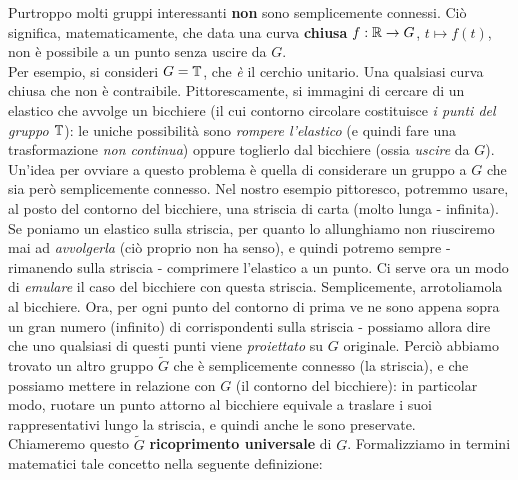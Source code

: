\documentclass[../../FisicaTeorica.tex]{subfiles}
\begin{document}
Purtroppo molti gruppi interessanti \textbf{non} sono semplicemente connessi. Ciò significa, matematicamente, che data una curva \textbf{chiusa} $f: \mathbb{R}\to G$, $t \mapsto f(t)$, non è possibile  a un punto senza uscire da $G$.\\
Per esempio, si consideri $G=\mathbb{T}$, che \textit{è} il cerchio unitario. Una qualsiasi curva chiusa che  non è contraibile. Pittorescamente, si immagini di cercare di  un elastico che avvolge un bicchiere (il cui contorno circolare costituisce \textit{i punti del gruppo $\mathbb{T}$}): le uniche possibilità sono \textit{rompere l'elastico} (e quindi fare una trasformazione \textit{non continua}) oppure toglierlo dal bicchiere (ossia \textit{uscire} da $G$).\\

Un'idea per ovviare a questo problema è quella di considerare un gruppo  a $G$ che sia però semplicemente connesso. Nel nostro esempio pittoresco, potremmo usare, al posto del contorno del bicchiere, una striscia di carta (molto lunga - infinita). Se poniamo un elastico sulla striscia, per quanto lo allunghiamo non riusciremo mai ad \textit{avvolgerla} (ciò proprio non ha senso), e quindi potremo sempre - rimanendo sulla striscia - comprimere l'elastico a un punto. Ci serve ora un modo di \textit{emulare} il caso del bicchiere con questa striscia. Semplicemente, arrotoliamola al bicchiere. Ora, per ogni punto del contorno di prima ve ne sono appena sopra un gran numero (infinito) di corrispondenti sulla striscia - possiamo allora dire che uno qualsiasi di questi punti viene \textit{proiettato} su $G$ originale. Perciò abbiamo trovato un altro gruppo $\tilde{G}$ che è semplicemente connesso (la striscia), e che possiamo mettere in relazione con $G$ (il contorno del bicchiere): in particolar modo, ruotare un punto attorno al bicchiere equivale a traslare i suoi rappresentativi lungo la striscia, e quindi anche le  sono preservate.\\
Chiameremo questo $\tilde{G}$ \textbf{ricoprimento universale} di $G$. Formalizziamo in termini matematici tale concetto nella seguente definizione:
\end{document}
